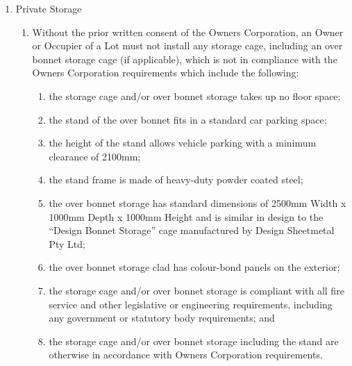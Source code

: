 \documentclass{article}
\begin{document}
\begin{enumerate}[label=\arabic*.]
\begin{enumerate}[label=\arabic{enumi}.\arabic*.]
\begin{enumerate}[label=\arabic{enumi}.\arabic*.]
\begin{enumerate}[label=(\arabic*)]

\item  An Owner or Occupier of a Lot must, at their cost, keep the Lot free from pests, including (without limitation) cockroaches, spiders, ants, rodents and other vermin.

\end{enumerate}

\item  Private Storage

\begin{enumerate}[label=(\arabic*)]

\item  Without the prior written consent of the Owners Corporation, an Owner or Occupier of a Lot must not install any storage cage, including an over bonnet storage cage (if applicable), which is not in compliance with the Owners Corporation requirements which include the following:

\begin{enumerate}[label=(\alph*)]

\item  the storage cage and/or over bonnet storage takes up no floor space;

\item  the stand of the over bonnet fits in a standard car parking space;

\item  the height of the stand allows vehicle parking with a minimum clearance of 2100mm;

\item  the stand frame is made of heavy-duty powder coated steel;

\item  the over bonnet storage has standard dimensions of 2500mm Width x 1000mm Depth x 1000mm Height and is similar in design to the “Design Bonnet Storage” cage manufactured by Design Sheetmetal Pty Ltd;

\item  the over bonnet storage clad has colour-bond panels on the exterior;

\item  the storage cage and/or over bonnet storage is compliant with all fire service and other legislative or engineering requirements, including any government or statutory body requirements; and

\item  the storage cage and/or over bonnet storage including the stand are otherwise in accordance with Owners Corporation requirements.


\end{enumerate}
\end{enumerate}
\end{enumerate}
\end{enumerate}
\end{enumerate}
\end{document}

